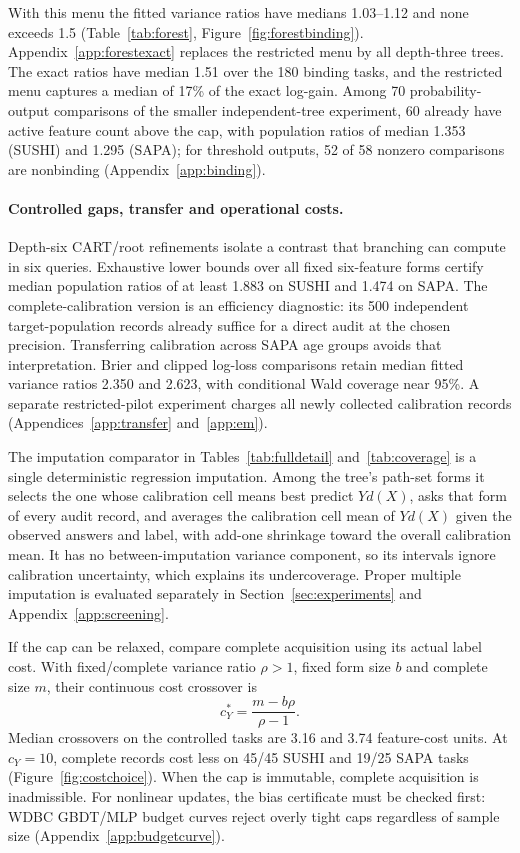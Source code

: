 

With this menu the fitted variance ratios have medians 1.03--1.12 and none exceeds 1.5 (Table~\ref{tab:forest}, Figure~\ref{fig:forestbinding}). Appendix~\ref{app:forestexact} replaces the restricted menu by all depth-three trees. The exact ratios have median 1.51 over the 180 binding tasks, and the restricted menu captures a median of 17\% of the exact log-gain. Among 70 probability-output comparisons of the smaller independent-tree experiment, 60 already have active feature count above the cap, with population ratios of median 1.353 (SUSHI) and 1.295 (SAPA); for threshold outputs, 52 of 58 nonzero comparisons are nonbinding (Appendix~\ref{app:binding}).

\paragraph{Controlled gaps, transfer and operational costs.}
Depth-six CART/root refinements isolate a contrast that branching can compute in six queries. Exhaustive lower bounds over all fixed six-feature forms certify median population ratios of at least 1.883 on SUSHI and 1.474 on SAPA. The complete-calibration version is an efficiency diagnostic: its 500 independent target-population records already suffice for a direct audit at the chosen precision. Transferring calibration across SAPA age groups avoids that interpretation. Brier and clipped log-loss comparisons retain median fitted variance ratios 2.350 and 2.623, with conditional Wald coverage near 95\%. A separate restricted-pilot experiment charges all newly collected calibration records (Appendices~\ref{app:transfer} and~\ref{app:em}).

The imputation comparator in Tables~\ref{tab:fulldetail} and~\ref{tab:coverage} is a single deterministic regression imputation. Among the tree's path-set forms it selects the one whose calibration cell means best predict $Yd(X)$, asks that form of every audit record, and averages the calibration cell mean of $Yd(X)$ given the observed answers and label, with add-one shrinkage toward the overall calibration mean. It has no between-imputation variance component, so its intervals ignore calibration uncertainty, which explains its undercoverage. Proper multiple imputation is evaluated separately in Section~\ref{sec:experiments} and Appendix~\ref{app:screening}.

If the cap can be relaxed, compare complete acquisition using its actual label cost. With fixed/complete variance ratio $\rho>1$, fixed form size $b$ and complete size $m$, their continuous cost crossover is
\begin{equation}
 c_Y^*=\frac{m-b\rho}{\rho-1}.\label{eq:costcross}
\end{equation}
Median crossovers on the controlled tasks are 3.16 and 3.74 feature-cost units. At $c_Y=10$, complete records cost less on 45/45 SUSHI and 19/25 SAPA tasks (Figure~\ref{fig:costchoice}). When the cap is immutable, complete acquisition is inadmissible. For nonlinear updates, the bias certificate must be checked first: WDBC GBDT/MLP budget curves reject overly tight caps regardless of sample size (Appendix~\ref{app:budgetcurve}).

